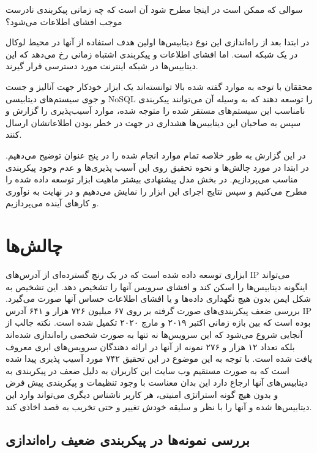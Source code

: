 \documentclass[10pt, a4paper]{article}
\begin{document}
سوالی که ممکن است در اینجا مطرح شود آن است که چه زمانی پیکربندی نادرست موجب
افشای اطلاعات می‌شود؟

در ابتدا بعد از راه‌اندازی این نوع دیتابیس‌ها اولین هدف استفاده از آنها در محیط
لوکال در یک شبکه است. اما افشای اطلاعات و پیکربندی اشتباه زمانی رخ می‌دهد که این
دیتابیس‌ها در شبکه اینترنت مورد دسترسی قرار گیرند.

محققان با توجه به موارد گفته شده بالا توانسته‌اند یک ابزار خودکار جهت آنالیز و
جست و جوی سیستم‌های دیتابیسی NoSQL را توسعه دهند که به وسیله آن می‌توانند
پیکربندی نامناسب این سیستم‌های مستقر شده را متوجه شده، موارد آسیب‌پذیری را گزارش
و سپس به صاحبان این دیتابیس‌ها هشداری در جهت در خطر بودن اطلاعاتشان ارسال کنند.

در این گزارش به طور خلاصه تمام موارد انجام شده را در پنج عنوان توضیح می‌دهیم. در
ابتدا در مورد چالش‌ها و نحوه تحقیق روی این آسیب پذیری‌ها و عدم وجود پیکربندی
مناسب می‌پردازیم. در بخش مدل پیشنهادی بیشتر ماهیت ابزار توسعه داده شده را مطرح
می‌کنیم و سپس نتایج اجرای این ابزار را نمایش می‌دهیم و در نهایت به نوآوری و
کار‌های آینده می‌پردازیم.

\newpage

\section{چالش‌ها}

ابزاری توسعه داده شده است که در یک رنج گسترده‌ای از آدرس‌های IP می‌تواند اینگونه
دیتابیس‌ها را اسکن کند و افشای سرویس آنها را تشخیص دهد. این تشخیص به شکل ایمن
بدون هیچ نگهداری داده‌ها و یا افشای اطلاعات حساس آنها صورت می‌گیرد. بررسی ضعف
پیکربندی‌های صورت گرفته بر روی ۶۷ میلیون ۷۲۶ هزار و ۶۴۱ آدرس IP بوده است که بین
بازه زمانی اکتبر ۲۰۱۹ و مارچ ۲۰۲۰ تکمیل شده است. نکته جالب از آنجایی شروع می‌شود
که این سرویس‌ها نه تنها به صورت شخصی راه‌اندازی شده‌اند بلکه تعداد ۱۲ هزار و ۲۷۶
نمونه از آنها در ارائه دهندگان سرویس‌های ابری معروف یافت شده است.  با توجه به
این موضوع در این تحقیق ۷۴۲ مورد آسیب پذیری پیدا شده است که به صورت مستقیم وب
سایت این کاربران به دلیل ضعف در پیکربندی به دیتابیس‌های آنها ارجاع دارد این بدان
معناست با وجود تنظیمات و پیکربندی پیش فرض و بدون هیچ گونه استراتژی امنیتی، هر
کاربر ناشناس دیگری می‌تواند وارد این دیتابیس‌ها شده و آنها را با نظر و سلیقه
خودش تغییر و حتی تخریب به قصد اخاذی کند.

\subsection{بررسی نمونه‌ها در پیکربندی ضعیف راه‌اندازی}
\end{document}
